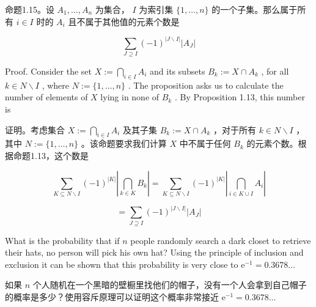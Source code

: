 \documentclass[10pt]{article}
\begin{document}
\begin{tcolorbox}\relax
命题1.15。设 \({A}_{1},\ldots ,{A}_{n}\) 为集合， \(I\) 为索引集 \(\{ 1,\ldots ,n\}\) 的一个子集。那么属于所有 \(i \in  I\) 时的 \({A}_{i}\) 且不属于其他值的元素个数是
\end{tcolorbox}

\[
\mathop{\sum }\limits_{{J \supseteq  I}}{\left( -1\right) }^{\left| J \smallsetminus  I\right| }\left| {A}_{J}\right| \tag{1.21}
\]

Proof. Consider the set \(X \mathrel{\text{ := }} \mathop{\bigcap }\limits_{{i \in  I}}{A}_{i}\) and its subsets \({B}_{k} \mathrel{\text{ := }} X \cap  {A}_{k}\) , for all \(k \in  N \smallsetminus  I\) , where \(N \mathrel{\text{ := }} \{ 1,\ldots ,n\}\) . The proposition asks us to calculate the number of elements of \(X\) lying in none of \({B}_{k}\) . By Proposition 1.13, this number is

\begin{tcolorbox}\relax
证明。考虑集合 \(X \mathrel{\text{ := }} \mathop{\bigcap }\limits_{{i \in  I}}{A}_{i}\) 及其子集 \({B}_{k} \mathrel{\text{ := }} X \cap  {A}_{k}\) ，对于所有 \(k \in  N \smallsetminus  I\) ，其中 \(N \mathrel{\text{ := }} \{ 1,\ldots ,n\}\) 。该命题要求我们计算 \(X\) 中不属于任何 \({B}_{k}\) 的元素个数。根据命题1.13，这个数是
\end{tcolorbox}

\[
\mathop{\sum }\limits_{{K \subseteq  N \smallsetminus  I}}{\left( -1\right) }^{\left| K\right| }\left| {\mathop{\bigcap }\limits_{{k \in  K}}{B}_{k}}\right|  = \mathop{\sum }\limits_{{K \subseteq  N \smallsetminus  I}}{\left( -1\right) }^{\left| K\right| }\left| {\mathop{\bigcap }\limits_{{i \in  K \cup  I}}{A}_{i}}\right|
\]

\[
= \mathop{\sum }\limits_{{J \supseteq  I}}{\left( -1\right) }^{\left| J \smallsetminus  I\right| }\left| {A}_{J}\right|
\]

What is the probability that if \(n\) people randomly search a dark closet to retrieve their hats, no person will pick his own hat? Using the principle of inclusion and exclusion it can be shown that this probability is very close to \({\mathrm{e}}^{-1} = {0.3678}\ldots\)

\begin{tcolorbox}\relax
如果 \(n\) 个人随机在一个黑暗的壁橱里找他们的帽子，没有一个人会拿到自己帽子的概率是多少？使用容斥原理可以证明这个概率非常接近 \({\mathrm{e}}^{-1} = {0.3678}\ldots\)
\end{tcolorbox}
\end{document}
